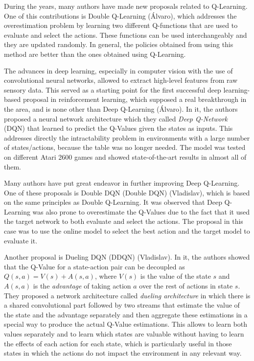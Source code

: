 \documentclass{article}
\begin{document}
During the years, many authors have made new proposals related to Q-Learning. One of this
contributions is Double Q-Learning \cite{NIPS2010_091d584f} (Álvaro), which addresses
the overestimation problem by learning two different Q-functions that are used to evaluate and
select the actions. These functions can be used interchangeably and they are updated randomly.
In general, the policies obtained from using this method are better than the ones obtained using
Q-Learning.

The advances in deep learning, especially in computer vision with the use of convolutional neural
networks, allowed to extract high-level features from raw sensory data. This served as a starting
point for the first successful deep learning-based proposal in reinforcement learning, which supposed
a real breakthrough in the area, and is none other than Deep Q-Learning
\cite{DeepMindAtari2013, mnih2015humanlevel} (Álvaro). In it, the authors proposed
a neural network architecture which they called \emph{Deep Q-Network} (DQN) that learned to predict
the Q-Values given the states as inputs. This addresses directly the intractability problem in
environments with a large number of states/actions, because the table was no longer needed.
The model was tested on different Atari 2600 games and showed state-of-the-art results in almost all
of them.

Many authors have put great endeavor in further improving Deep Q-Learning. One of these proposals
is Double DQN (Double DQN) \cite{DeepMindDDQN2015} (Vladislav), which is based on the same principles
as Double Q-Learning. It was observed that Deep Q-Learning was also prone to overestimate the Q-Values
due to the fact that it used the target network to both evaluate and select the actions. The proposal
in this case was to use the online model to select the best action and the target model to evaluate
it.

Another proposal is Dueling DQN (DDQN) \cite{DeepMindDueling} (Vladislav). In it, the authors showed that
the Q-Value for a state-action pair can be decoupled as $Q(s, a) = V(s) + A(s, a)$, where $V(s)$ is
the value of the state $s$ and $A(s, a)$ is the \emph{advantage} of taking action $a$ over the rest
of actions in state $s$. They proposed a network architecture called \emph{dueling architecture} in
which there is a shared convolutional part followed by two streams that estimate the value of the state
and the advantage separately and then aggregate these estimations in a special way to produce the actual
Q-Value estimations. This allows to learn both values separately and to learn which states are
valuable without having to learn the effects of each action for each state, which is particularly useful
in those states in which the actions do not impact the environment in any relevant way.
\end{document}
